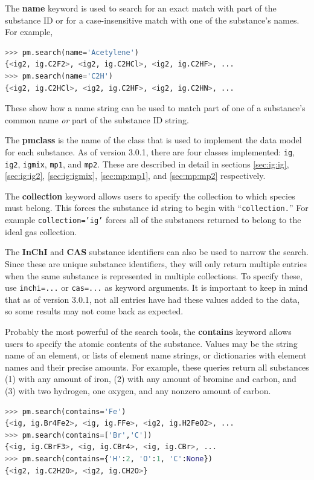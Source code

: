 The {\bf name} keyword is used to search for an exact match with part of the substance ID or for a case-insensitive match with one of the substance's names.  For example, 
\begin{lstlisting}[language=Python]
>>> pm.search(name='Acetylene')
{<ig2, ig.C2F2>, <ig2, ig.C2HCl>, <ig2, ig.C2HF>, ...
>>> pm.search(name='C2H')
{<ig2, ig.C2HCl>, <ig2, ig.C2HF>, <ig2, ig.C2HN>, ...
\end{lstlisting}

These show how a name string can be used to match part of one of a substance's common name \emph{or} part of the substance ID string.

The {\bf pmclass} is the name of the class that is used to implement the data model for each substance.  As of version 3.0.1, there are four classes implemented: \texttt{ig}, \texttt{ig2}, \texttt{igmix}, \texttt{mp1}, and \texttt{mp2}. These are described in detail in sections \ref{sec:ig:ig}, \ref{sec:ig:ig2}, \ref{sec:ig:igmix}, \ref{sec:mp:mp1}, and \ref{sec:mp:mp2} respectively.

The {\bf collection} keyword allows users to specify the collection to which species must belong.  This forces the substance id string to begin with ``\verb|collection.|''  For example \texttt{collection='ig'} forces all of the substances returned to belong to the ideal gas collection.

The {\bf InChI}\cite{inchi:website} and {\bf CAS}\cite{cas:website} substance identifiers can also be used to narrow the search.  Since these are unique substance identifiers, they will only return multiple entries when the same substance is represented in multiple collections.  To specify these, use \texttt{inchi=...} or \texttt{cas=...} as keyword arguments.  It is important to keep in mind that as of version 3.0.1, not all entries have had these values added to the data, so some results may not come back as expected.

Probably the most powerful of the search tools, the {\bf contains} keyword allows users to specify the atomic contents of the substance.  Values may be the string name of an element, or lists of element name strings, or dictionaries with element names and their precise amounts.  For example, these queries return all substances (1) with any amount of iron, (2) with any amount of bromine and carbon, and (3) with two hydrogen, one oxygen, and any nonzero amount of carbon.
\begin{lstlisting}[language=Python]
>>> pm.search(contains='Fe')
{<ig, ig.Br4Fe2>, <ig, ig.FFe>, <ig2, ig.H2FeO2>, ...
>>> pm.search(contains=['Br','C'])
{<ig, ig.CBrF3>, <ig, ig.CBr4>, <ig, ig.CBr>, ...
>>> pm.search(contains={'H':2, 'O':1, 'C':None})
{<ig2, ig.C2H2O>, <ig2, ig.CH2O>}
\end{lstlisting}

